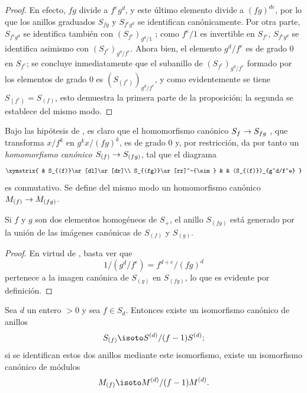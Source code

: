 \documentclass[oneside,10pt]{amsart}
\makeatletter
\newcommand{\ega@arrow}[2]{\mathchoice{#1}{#2}{#2}{#2}}
\renewcommand{\to}{\ega@arrow{\longrightarrow}{\rightarrow}}
\let\EGAOriginalLabel\label
\renewcommand{\label}[1]{\phantomsection\EGAOriginalLabel{#1}}
\makeatother
\begin{document}
\begin{proof}
En efecto, $fg$ divide a $f^eg^d$, y este último elemento divide a $(fg)^{de}$, por lo que los anillos graduados $S_{fg}$ y $S_{f^eg^d}$ se identifican canónicamente.
Por otra parte, $S_{f^eg^d}$ se identifica también con $(S_{f^e})_{g^d/1}$ ; como $f^e/1$ es invertible en $S_{f^e}$, $S_{f^eg^d}$ se identifica asimismo con $(S_{f^e})_{g^d/f^e}$.
Ahora bien, el elemento $g^d/f^e$ es de grado $0$ en $S_{f^e}$; se concluye inmediatamente que el subanillo de $(S_{f^e})_{g^d/f^e}$ formado por los elementos de grado $0$ es $(S_{(f^e)})_{g^d/f^e}$, y como evidentemente se tiene $S_{(f^e)}=S_{(f)}$, esto demuestra la primera parte de la proposición; la segunda se establece del mismo modo.
\end{proof}

\begin{env}[2.2.3]
\label{II.2.2.3}
Bajo las hipótesis de , es claro que el homomorfismo canónico $S_f\to S_{fg}$ , que transforma $x/f^k$ en $g^kx/(fg)^k$, es de grado $0$ y, por restricción, da por tanto un \emph{homomorfismo canónico $S_{(f)}\to S_{(fg)}$}, tal que el diagrama
\[
  \xymatrix{
    & S_{(f)}\ar[dl]\ar[dr]\\
    S_{(fg)}\ar[rr]^-{\sim} & &
    (S_{(f)})_{g^d/f^e}
  }
\]
es conmutativo.
Se define del mismo modo un homomorfismo canónico $M_{(f)}\to M_{(fg)}$.
\end{env}

\begin{lemma}[2.2.4]
\label{II.2.2.4}
Si $f$ y $g$ son dos elementos homogéneos de $S_+$, el anillo $S_{(fg)}$ está generado por la unión de las imágenes canónicas de $S_{(f)}$ y $S_{(g)}$.
\end{lemma}

\begin{proof}
En virtud de , basta ver que
\[
  1/(g^d/f^e)=f^{d+e}/(fg)^d
\]
pertenece a la imagen canónica de $S_{(g)}$ en $S_{(fg)}$, lo que es evidente por definición.
\end{proof}

\begin{proposition}[2.2.5]
\label{II.2.2.5}
Sea $d$ un entero $>0$ y sea $f\in S_d$.
Entonces existe un isomorfismo canónico de anillos
\[
  S_{(f)}\isoto S^{(d)}/(f-1)S^{(d)};
\]
si se identifican estos dos anillos mediante este isomorfismo, existe un isomorfismo canónico de módulos
\[
  M_{(f)}\isoto M^{(d)}/(f-1)M^{(d)}.
\]
\end{proposition}
\end{document}
